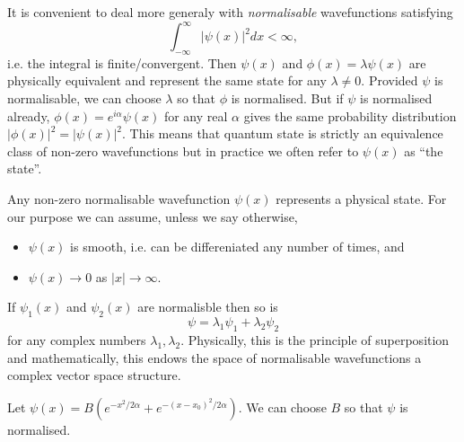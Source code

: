 \documentclass[a4paper]{article}
\begin{document}
It is convenient to deal more generaly with \emph{normalisable} wavefunctions satisfying
\[
  \int_{-\infty}^\infty |\psi(x)|^2 dx < \infty,
\]
i.e. the integral is finite/convergent. Then $\psi(x)$ and $\phi(x) = \lambda\psi(x)$ are physically equivalent and represent the same state for any $\lambda\neq0$. Provided $\psi$ is normalisable, we can choose $\lambda$ so that $\phi$ is normalised. But if $\psi$ is normalised already, $\phi(x) = e^{i\alpha}\psi(x)$ for any real $\alpha$ gives the same probability distribution $|\phi(x)|^2 = |\psi(x)|^2$. This means that quantum state is strictly an equivalence class of non-zero wavefunctions but in practice we often refer to $\psi(x)$ as ``the state''.

Any non-zero normalisable wavefunction $\psi(x)$ represents a physical state. For our purpose we can assume, unless we say otherwise,
\begin{assumption}\leavevmode
\begin{itemize}
\item $\psi(x)$ is smooth, i.e. can be differeniated any number of times, and
  \item $\psi(x) \to 0$ as $|x|\to\infty$.
\end{itemize}
\end{assumption}

If $\psi_1(x)$ and $\psi_2(x)$ are normalisble then so is
\[
  \psi = \lambda_1\psi_1 + \lambda_2\psi_2
\]
for any complex numbers $\lambda_1, \lambda_2$. Physically, this is the principle of superposition and mathematically, this endows the space of normalisable wavefunctions a complex vector space structure.

\begin{eg}
  Let $\psi(x) = B(e^{-x^2/2\alpha}+e^{-(x-x_0)^2/2\alpha})$. We can choose $B$ so that $\psi$ is normalised.
  \begin{center}
  \end{center}
 
\end{eg}
\end{document}

